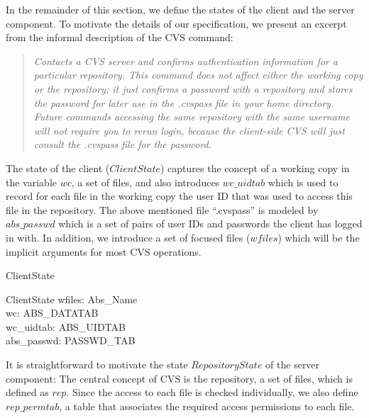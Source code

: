In the remainder of this section, we define the states of the client and the
server component.  To motivate the details of our specification, we present an
excerpt from the informal description of the CVS  command:
\begin{quote}
  \emph{Contacts a CVS server and confirms authentication information for a
    particular repository. This command does not affect either the working copy
    or the repository; it just confirms a password with a repository and stores
    the password for later use in the .cvspass file in your home directory.
    Future commands accessing the same repository with the same username will
    not require you to rerun login, because the client-side CVS will just
    consult the .cvspass file for the password.}~\cite{fogel:cvs:1999}
\end{quote}
The state of the client ($ClientState$) captures the concept of a working copy
in the variable $wc$, a set of files, and also introduces $wc\_uidtab$ which is
used to record for each file in the working copy the user ID that was used to
access this file in the repository.  The above mentioned file ``.cvspass'' is
modeled by $abs\_passwd$ which is a set of pairs of user IDs and passwords the
client has logged in with.  In addition, we introduce a set of focused files
($wfiles$) which will be the implicit arguments for most CVS operations.
\begin{doc}{ClientState}
  \begin{schema}{ClientState}
    wfiles: \power Abs\_Name \\
    wc: ABS\_DATATAB \\
    wc\_uidtab: ABS\_UIDTAB \\
    abs\_passwd: PASSWD\_TAB \\
  \end{schema}
\end{doc}
It is straightforward to motivate the state $RepositoryState$ of the server
component: The central concept of CVS is the repository, a set of files, which
is defined as $rep$.  Since the access to each file is checked individually, we
also define $rep\_permtab$, a table that associates the required access
permissions to each file.

